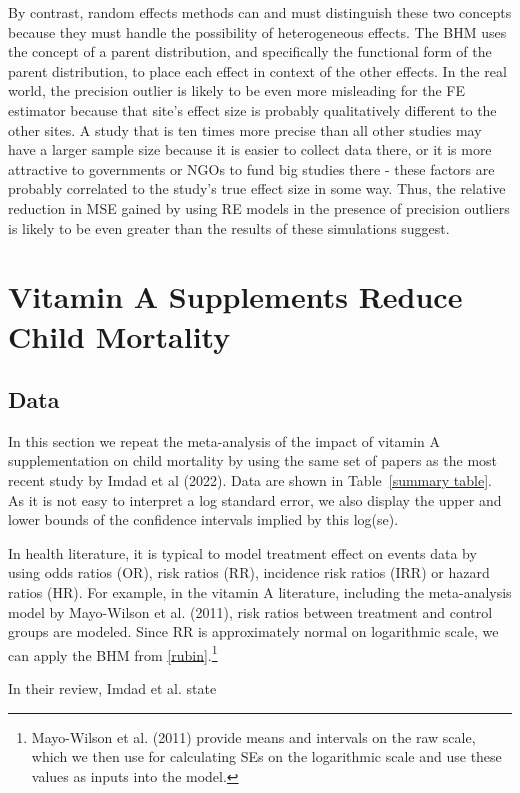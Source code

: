 \documentclass[12pt]{article}
\begin{document}
By contrast, random effects methods can and must distinguish these two concepts because they must handle the possibility of heterogeneous effects. The BHM uses the concept of a parent distribution, and specifically the functional form of the parent distribution, to place each effect in context of the other effects. In the real world, the precision outlier is likely to be even more misleading for the FE estimator because that site's effect size is probably qualitatively different to the other sites. A study that is ten times more precise than all other studies may have a larger sample size because it is easier to collect data there, or it is more attractive to governments or NGOs to fund big studies there - these factors are probably correlated to the study's true effect size in some way. Thus, the relative reduction in MSE gained by using RE models in the presence of precision outliers is likely to be even greater than the results of these simulations suggest. 

\section{Vitamin A Supplements Reduce Child Mortality}

\subsection{Data}

In this section we repeat the meta-analysis of the impact of vitamin A supplementation on child mortality by using the same set of papers as the most recent study by Imdad et al (2022). Data are shown in Table~\ref{summary table}. 
As it is not easy to interpret a log standard error, we also display the upper and lower bounds of the confidence intervals implied by this log(se). 

In health literature, it is typical to model treatment effect on events data by using odds ratios (OR), risk ratios (RR), incidence risk ratios (IRR) or hazard ratios (HR). For example, in the vitamin A literature, including the meta-analysis model by Mayo-Wilson et al. (2011), risk ratios between treatment and control groups are modeled. Since RR is approximately normal on logarithmic scale, we can apply the BHM from \eqref{rubin}.\footnote{Mayo-Wilson et al. (2011) provide means and intervals on the raw scale, which we then use for calculating SEs on the logarithmic scale and use these values as inputs into the model.}

In their review, Imdad et al. state
\end{document}
